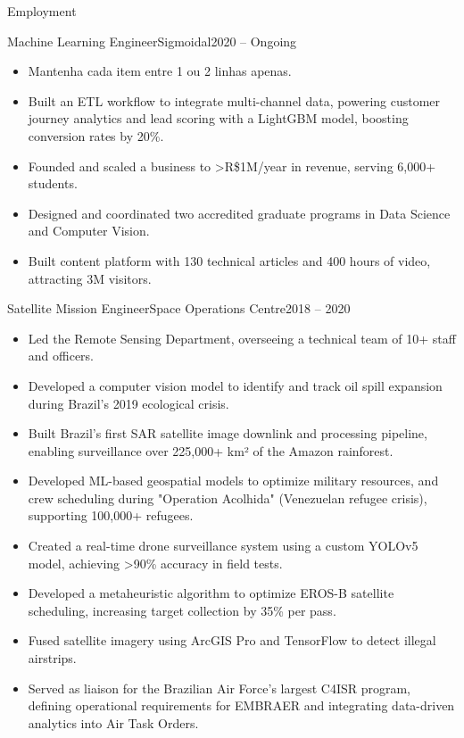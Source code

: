 \documentclass[]{mcdowellcv}
\begin{document}
	\makeheader
	
	\begin{cvsection}{Employment}
		\begin{cvsubsection}{Machine Learning Engineer}{Sigmoidal}{2020 -- Ongoing}
			\begin{itemize}
				\item Mantenha cada item entre 1 ou 2 linhas apenas.
				\item Built an ETL workflow to integrate multi-channel data, powering customer journey analytics and lead scoring with a LightGBM model, boosting conversion rates by 20\%.
				\item Founded and scaled a business to >R\$1M/year in revenue, serving 6,000+ students.
				\item Designed and coordinated two accredited graduate programs in Data Science and Computer Vision.
				\item Built content platform with 130 technical articles and 400 hours of video, attracting 3M visitors.
			\end{itemize}
		\end{cvsubsection}
		
		\begin{cvsubsection}{Satellite Mission Engineer}{Space Operations Centre}{2018 -- 2020}			
			\begin{itemize}
				\item Led the Remote Sensing Department, overseeing a technical team of 10+ staff and officers.
				\item Developed a computer vision model to identify and track oil spill expansion during Brazil's 2019 ecological crisis.
				\item Built Brazil’s first SAR satellite image downlink and processing pipeline, enabling surveillance over 225,000+ km² of the Amazon rainforest.
				\item Developed ML-based geospatial models to optimize military resources, and crew scheduling during "Operation Acolhida" (Venezuelan refugee crisis), supporting 100,000+ refugees.
				\item Created a real-time drone surveillance system using a custom YOLOv5 model, achieving >90\% accuracy in field tests.
				\item Developed a metaheuristic algorithm to optimize EROS-B satellite scheduling, increasing target collection by 35\% per pass.
				\item Fused satellite imagery using ArcGIS Pro and TensorFlow to detect illegal airstrips.
				\item Served as liaison for the Brazilian Air Force’s largest C4ISR program, defining operational requirements for EMBRAER and integrating data-driven analytics into Air Task Orders.
			\end{itemize}
		\end{cvsubsection}
		

\end{cvsection}
\end{document}
